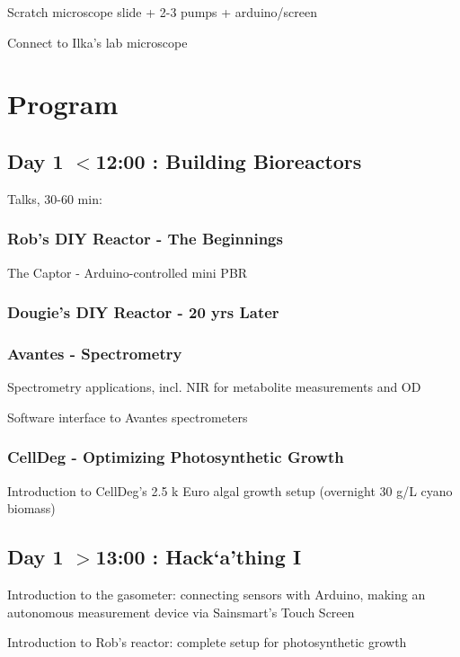\documentclass[12pt,a4paper]{article}
\begin{document}
Scratch microscope slide + 2-3 pumps + arduino/screen

Connect to Ilka's lab microscope


\newpage

\section{Program}

\subsection{Day 1 $<$12:00 : Building Bioreactors}

Talks, 30-60 min:

\subsubsection{Rob's DIY Reactor - The Beginnings}

The Captor - Arduino-controlled mini PBR

\subsubsection{Dougie's DIY Reactor - 20 yrs Later}
\subsubsection{Avantes - Spectrometry}

Spectrometry applications, incl. NIR for metabolite measurements and OD

Software interface to Avantes spectrometers

\subsubsection{CellDeg - Optimizing Photosynthetic Growth}

Introduction to CellDeg's 2.5 k Euro algal growth setup (overnight 30 g/L
cyano biomass)

\subsection{Day 1 $>$13:00 : Hack`a'thing I}

Introduction to the gasometer: connecting sensors with Arduino,
making an autonomous measurement device via Sainsmart's Touch Screen

Introduction to Rob's reactor: complete setup for photosynthetic growth
\end{document}
